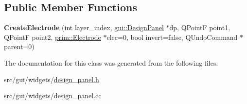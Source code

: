 \subsection*{Public Member Functions}
\begin{DoxyCompactItemize}
\item 
{\bfseries Create\+Electrode} (int layer\+\_\+index, \hyperlink{classgui_1_1DesignPanel}{gui\+::\+Design\+Panel} $\ast$dp, Q\+PointF point1, Q\+PointF point2, \hyperlink{classprim_1_1Electrode}{prim\+::\+Electrode} $\ast$elec=0, bool invert=false, Q\+Undo\+Command $\ast$parent=0)\hypertarget{classgui_1_1DesignPanel_1_1CreateElectrode_a95822013d7af2df06696360bc47d2227}{}\label{classgui_1_1DesignPanel_1_1CreateElectrode_a95822013d7af2df06696360bc47d2227}

\end{DoxyCompactItemize}


The documentation for this class was generated from the following files\+:\begin{DoxyCompactItemize}
\item 
src/gui/widgets/\hyperlink{design__panel_8h}{design\+\_\+panel.\+h}\item 
src/gui/widgets/design\+\_\+panel.\+cc\end{DoxyCompactItemize}
